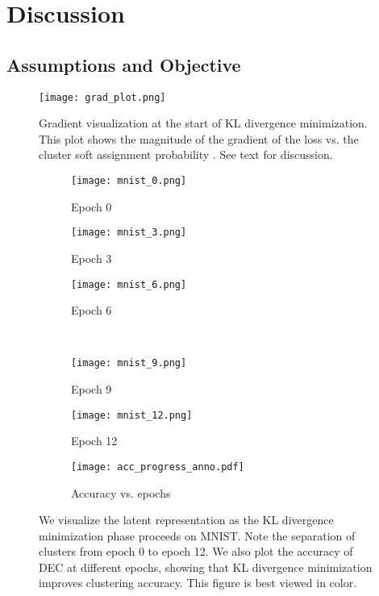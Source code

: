 \documentclass{article}
\begin{document}
\section{Discussion}
\subsection{Assumptions and Objective}

\begin{figure}[!h]
\centering
\texttt{[image: grad\_plot.png]}
\caption{Gradient visualization at the start of KL divergence minimization.
This plot shows the magnitude of the gradient of the loss  vs. the cluster soft assignment probability .
See text for discussion.}
\label{fig:grad}
\end{figure}
\label{sec:objective}

\begin{figure*}[t]
\centering
\begin{subfigure}[b]{0.25\textwidth}
\texttt{[image: mnist\_0.png]}
\caption{Epoch 0}
\end{subfigure}\quad\quad
\begin{subfigure}[b]{0.25\textwidth}
\texttt{[image: mnist\_3.png]}
\caption{Epoch 3}
\end{subfigure}\quad\quad
\begin{subfigure}[b]{0.25\textwidth}
\texttt{[image: mnist\_6.png]}
\caption{Epoch 6}
\end{subfigure}\\
\begin{subfigure}[b]{0.25\textwidth}
\texttt{[image: mnist\_9.png]}
\caption{Epoch 9}
\end{subfigure}\quad\quad
\begin{subfigure}[b]{0.25\textwidth}
\texttt{[image: mnist\_12.png]}
\caption{Epoch 12}
\end{subfigure}\quad\quad
\begin{subfigure}[b]{0.25\textwidth}
\texttt{[image: acc\_progress\_anno.pdf]}
\caption{Accuracy vs. epochs}
\end{subfigure}
\caption{We visualize the latent representation as the KL divergence minimization phase proceeds on MNIST.
Note the separation of clusters from epoch 0 to epoch 12.
We also plot the accuracy of DEC at different epochs, showing that KL divergence minimization improves clustering accuracy. This figure is best viewed in color.}
\label{fig:progress}
\end{figure*}
\end{document}
